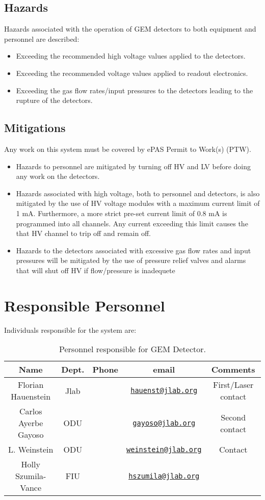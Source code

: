 \subsection{Hazards} 
Hazards associated with the operation of GEM detectors to both equipment and personnel are described:
\begin{itemize}
\item Exceeding the recommended high voltage values applied to the detectors.
\item Exceeding the recommended voltage values applied to readout electronics.
\item Exceeding the gas flow rates/input pressures to the detectors leading to the rupture
of the detectors.
\end{itemize}
\subsection{Mitigations}

Any work on this system must be covered by ePAS Permit to Work(s) (PTW).
\begin{itemize}
\item Hazards to personnel are mitigated by turning oﬀ HV and LV before doing any
  work on the detectors.
\item Hazards associated with high voltage, both to personnel and detectors, is also
mitigated by the use of HV voltage modules with a maximum current limit of 1
mA. Furthermore, a more strict pre-set current limit of 0.8 mA is programmed into
all channels. Any current exceeding this limit causes the that HV channel to trip
off and remain off.
\item Hazards to the detectors associated with excessive gas flow rates and input pressures
  will be mitigated by the use of pressure relief valves and alarms that will shut off HV if flow/pressure is inadequete
\end{itemize}
  \section{Responsible Personnel}
\label{sec:personnelGEM}
Individuals responsible for the system are:

\begin{table}[!htb]
 \centering
 \begin{tabular}{|c|c|c|c|c|}
\hline
 Name&Dept.&Phone&email&Comments \\ \hline
 Florian Hauenstein & Jlab & & \href{mailto:hauenst@jlab.org}{\nolinkurl{hauenst@jlab.org}} &  First/Laser contact\\ \hline
Carlos Ayerbe Gayoso  & ODU & & \href{mailto:gayoso@jlab.org}{\nolinkurl{gayoso@jlab.org}} & Second contact \\ \hline
 L.  Weinstein & ODU &  &\href{mailto:weinstein@jlab.org}{\nolinkurl{weinstein@jlab.org}}& Contact  \\ \hline
 Holly Szumila-Vance & FIU &  &\href{mailto:hszumila@jlab.org}{\nolinkurl{hszumila@jlab.org}}& \\ \hline
 \end{tabular}
\caption{Personnel responsible for GEM  Detector.} 
\label{tb:gem}
\end{table}


